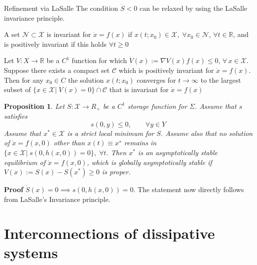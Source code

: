 \documentclass[aspectratio=169]{beamer}
\newcommand{\bbR}{\mathbb{R}}
\newtheorem{proposition}{Proposition}
\begin{document}
\begin{frame}{Refinement via LaSalle}
	The condition $\dot{S} <0$ can be relaxed by using the LaSalle invariance principle.
	\begin{definition}
		A set $\mathcal{N} \subset \mathcal{X}$ is invariant for $\dot{x} = f(x)$ if $x(t; x_0) \in \mathcal{X}, 
		\; \forall  x_0 \in \mathcal{N}, \, \forall t \in \bbR$, and is positively invariant if this holds $\forall t\ge 0$
	\end{definition}
	
	\begin{theorem}
		Let $V : X \rightarrow \bbR$ be a $C^1$ function for which $\dot{V}(x) := \nabla V(x)
		f(x) \le 0, \, \forall \, x \in \mathcal{X}$. Suppose there exists a compact set $\mathcal{C}$ which is positively invariant for $\dot{x} = f(x)$. Then for any $x_0 \in C$ the solution $x(t; x_0)$ converges
		for $t \rightarrow \infty$ to the largest subset of $\{x \in \mathcal{X} | \; \dot{V}(x) = 0\} \cap \mathcal{C}$ that is invariant for $\dot{x} = f(x)$
	\end{theorem}
	
\end{frame}

\begin{frame}
	\begin{proposition}
		Let  $S : \mathcal{X} \rightarrow R_+$ be a $C^1$ storage
		function for $\Sigma$. Assume that $s$ satisfies
		\begin{equation*}
			s(0, y) \le 0, \qquad \forall y \in Y
		\end{equation*}
		Assume that $x^* \in \mathcal{X}$ is a strict local minimum for $S$. Assume also that no
		solution of $\dot{x} = f (x, 0)$ other than $x(t) \equiv x^∗$ remains in $\{x \in \mathcal{X} |\; s(0, h(x, 0)) = 0\}, \; \forall t$. Then $x^*$ is an asymptotically stable equilibrium of $\dot{x} = f (x, 0)$, which is 	globally asymptotically stable if $V(x):= S(x) - S(x^*) \ge 0$ is proper.
	\end{proposition}
	\textbf{Proof}  $\dot{S}(x) = 0 \implies s(0, h(x, 0)) = 0$. The statement now directly follows from LaSalle’s Invariance
	principle.
	
\end{frame}


\section{Interconnections of dissipative systems}
\end{document}
